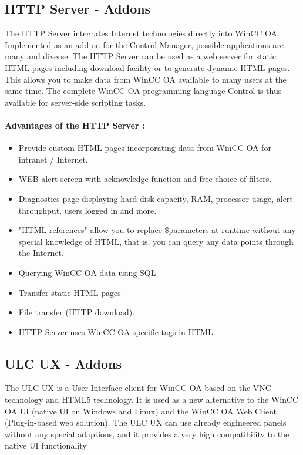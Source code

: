 \documentclass[a4paper, 12pt]{article}
\begin{document}
\subsection{HTTP Server - Addons}
The HTTP Server integrates Internet technologies directly into WinCC OA. Implemented as an add-on for the Control Manager, possible applications are many and diverse. 
The HTTP Server can be used as a web server for static HTML pages including download facility or to generate dynamic HTML pages. 
This allows you to make data from WinCC OA available to many users at the same time. The complete WinCC OA programming language Control is thus available for server-side scripting tasks.
\paragraph{Advantages of the HTTP Server :}
\begin{itemize}
    \item Provide custom HTML pages incorporating data from WinCC OA for intranet / Internet.
    \item WEB alert screen with acknowledge function and free choice of filters.
    \item Diagnostics page displaying hard disk capacity, RAM, processor usage, alert \\throughput, users logged in and more.
    \item "HTML references" allow you to replace \$parameters at runtime without any special knowledge of HTML, that is, you can query any data points through the Internet.
    \item Querying WinCC OA data using SQL
    \item Transfer static HTML pages
    \item File transfer (HTTP download).
    \item HTTP Server uses WinCC OA specific tags in HTML.
\end{itemize}

\subsection{ULC UX - Addons}
The ULC UX is a User Interface client for WinCC OA based on the VNC technology and HTML5 technology. 
It is used as a new alternative to the WinCC OA UI (native UI on Windows and Linux) and the WinCC OA Web Client (Plug-in-based web solution).
The ULC UX can use already engineered panels without any special adaptions, and it provides a very high compatibility to the native UI functionality
\end{document}
